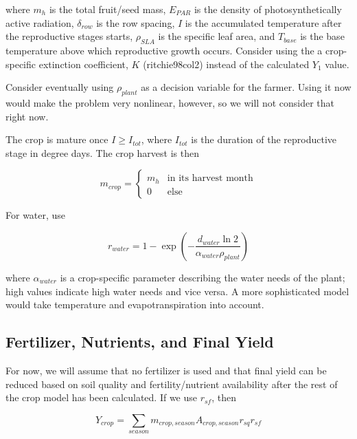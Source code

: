 \documentclass[letter,12pt]{article}
\begin{document}
\noindent where $m_h$ is the total fruit/seed mass, $E_{PAR}$ is the density of photosynthetically active radiation, $\delta_{row}$ is the row spacing, $I$ is the accumulated temperature after the reproductive stages starts, $\rho_{SLA}$ is the specific leaf area, and $T_{base}$ is the base temperature above which reproductive growth occurs.  Consider using the a crop-specific extinction coefficient, $K$ (ritchie98col2) instead of the calculated $Y_1$ value.

Consider eventually using $\rho_{plant}$ as a decision variable for the farmer.  Using it now would make the problem very nonlinear, however, so we will not consider that right now.

The crop is mature once $I \geq I_{tot}$, where $I_{tot}$ is the duration of the reproductive stage in degree days.  The crop harvest is then 

\begin{equation}
m_{crop} = \left\{ \begin{array}{cc}
m_h			& \text{in its harvest month} \\
0				& \text{else} 
\end{array} \right.
\end{equation} 

For water, use

\begin{equation}
r_{water} = 1 - \exp \left(-\frac{d_{water} \ln 2}{\alpha_{water} \rho_{plant}} \right)
\end{equation}

\noindent where $\alpha_{water}$ is a crop-specific parameter describing the water needs of the plant; high values indicate high water needs and vice versa.  A more sophisticated model would take temperature and evapotranspiration into account.

\subsection{Fertilizer, Nutrients, and Final Yield}

For now, we will assume that no fertilizer is used and that final yield can be reduced based on soil quality and fertility/nutrient availability after the rest of the crop model has been calculated.  If we use $r_{sf}$, then

\begin{equation}
Y_{crop} = \sum_{season} m_{crop,season} A_{crop,season} r_{sq} r_{sf}
\end{equation} 
\end{document}
